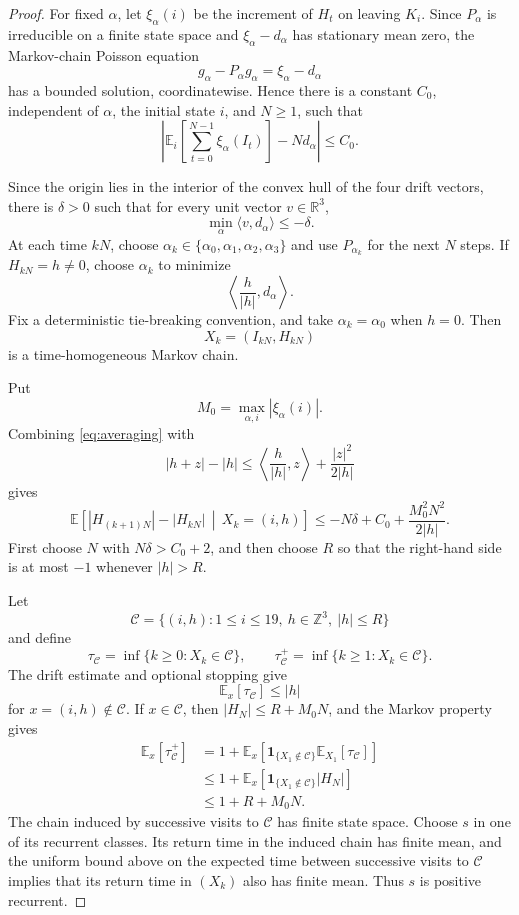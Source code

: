\documentclass[11pt]{article}
\newcommand{\Z}{\mathbb{Z}}
\begin{document}
\begin{proof}
For fixed $\alpha$, let $\xi_\alpha(i)$ be the increment of $H_t$ on leaving $K_i$. Since $P_\alpha$ is irreducible on a finite state space and $\xi_\alpha-d_\alpha$ has stationary mean zero, the Markov-chain Poisson equation
\[
g_\alpha-P_\alpha g_\alpha=\xi_\alpha-d_\alpha
\]
has a bounded solution, coordinatewise. Hence there is a constant $C_0$, independent of $\alpha$, the initial state $i$, and $N\geq1$, such that
\begin{equation}\label{eq:averaging}
\left|
\mathbb E_i\left[\sum_{t=0}^{N-1}\xi_\alpha(I_t)\right]-Nd_\alpha
\right|\leq C_0.
\end{equation}

Since the origin lies in the interior of the convex hull of the four drift vectors, there is $\delta>0$ such that for every unit vector $v\in\mathbb R^3$,
\[
\min_\alpha\langle v,d_\alpha\rangle\leq-\delta.
\]
At each time $kN$, choose $\alpha_k\in\{\alpha_0,\alpha_1,\alpha_2,\alpha_3\}$ and use $P_{\alpha_k}$ for the next $N$ steps. If $H_{kN}=h\neq0$, choose $\alpha_k$ to minimize
\[
\left\langle \frac{h}{|h|},d_\alpha\right\rangle.
\]
Fix a deterministic tie-breaking convention, and take $\alpha_k=\alpha_0$ when $h=0$. Then
\[
X_k=(I_{kN},H_{kN})
\]
is a time-homogeneous Markov chain.

Put
\[
M_0=\max_{\alpha,i}|\xi_\alpha(i)|.
\]
Combining \eqref{eq:averaging} with
\[
|h+z|-|h|\leq \left\langle\frac h{|h|},z\right\rangle+\frac{|z|^2}{2|h|}
\]
gives
\[
\mathbb E\left[
|H_{(k+1)N}|-|H_{kN}|
\,\middle|\,
X_k=(i,h)
\right]
\leq-N\delta+C_0+\frac{M_0^2N^2}{2|h|}.
\]
First choose $N$ with $N\delta>C_0+2$, and then choose $R$ so that the right-hand side is at most $-1$ whenever $|h|>R$.

Let
\[
\mathcal C=\{(i,h):1\leq i\leq19,\ h\in\Z^3,\ |h|\leq R\}
\]
and define
\[
\tau_{\mathcal C}=\inf\{k\geq0:X_k\in\mathcal C\},
\qquad
\tau_{\mathcal C}^+=\inf\{k\geq1:X_k\in\mathcal C\}.
\]
The drift estimate and optional stopping give
\[
\mathbb E_x\left[\tau_{\mathcal C}\right]\leq |h|
\]
for $x=(i,h)\notin\mathcal C$. If $x\in\mathcal C$, then $|H_N|\leq R+M_0N$, and the Markov property gives
\[
\begin{aligned}
\mathbb E_x\left[\tau_{\mathcal C}^+\right]
&=1+\mathbb E_x\left[
\mathbf 1_{\{X_1\notin\mathcal C\}}
\mathbb E_{X_1}\left[\tau_{\mathcal C}\right]
\right]\\
&\leq1+\mathbb E_x\left[
\mathbf 1_{\{X_1\notin\mathcal C\}}|H_N|
\right]\\
&\leq1+R+M_0N.
\end{aligned}
\]
The chain induced by successive visits to $\mathcal C$ has finite state space. Choose $s$ in one of its recurrent classes. Its return time in the induced chain has finite mean, and the uniform bound above on the expected time between successive visits to $\mathcal C$ implies that its return time in $(X_k)$ also has finite mean. Thus $s$ is positive recurrent.
\end{proof}
\end{document}
